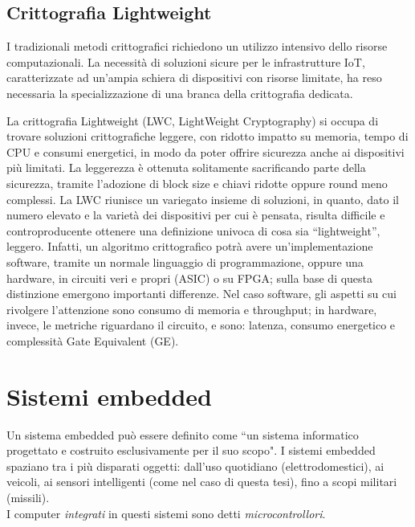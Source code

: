 \documentclass[target=bach,aauheader=,style=]{thud}
\begin{document}
        \subsection{Crittografia Lightweight}
        I tradizionali metodi crittografici richiedono un utilizzo intensivo dello risorse computazionali. La necessità di soluzioni sicure per le infrastrutture IoT, caratterizzate ad un'ampia schiera di dispositivi con risorse limitate, ha reso necessaria la specializzazione di una branca della crittografia dedicata.
        
        La crittografia Lightweight (LWC, LightWeight Cryptography) si occupa di trovare soluzioni crittografiche leggere, con ridotto impatto su memoria, tempo di CPU e consumi energetici, in modo da poter offrire sicurezza anche ai dispositivi più limitati. La leggerezza è ottenuta solitamente sacrificando parte della sicurezza, tramite l'adozione di block size e chiavi ridotte oppure round meno complessi\cite{cryptometh}. La LWC riunisce un variegato insieme di soluzioni, in quanto, dato il numero elevato e la varietà dei dispositivi per cui è pensata, risulta difficile e controproducente ottenere una definizione univoca di cosa sia ``lightweight'', leggero. Infatti, un algoritmo crittografico potrà avere un'implementazione software, tramite un normale linguaggio di programmazione, oppure una hardware, in circuiti veri e propri (ASIC) o su FPGA; sulla base di questa distinzione emergono importanti differenze. Nel caso software, gli aspetti su cui rivolgere l'attenzione sono consumo di memoria e throughput; in hardware, invece, le metriche riguardano il circuito, e sono: latenza, consumo energetico e complessità Gate Equivalent (GE).

    \section{Sistemi embedded}
    Un sistema embedded può essere definito come ``un sistema informatico progettato e costruito esclusivamente per il suo scopo"\cite{embeddedsys}.
    I sistemi embedded spaziano tra i più disparati oggetti: dall'uso quotidiano (elettrodomestici), ai veicoli, ai sensori intelligenti (come nel caso di questa tesi), fino a scopi militari (missili).\\
    I computer \textit{integrati} in questi sistemi sono detti \textit{microcontrollori}\cite{architetture}.
    
\end{document}
